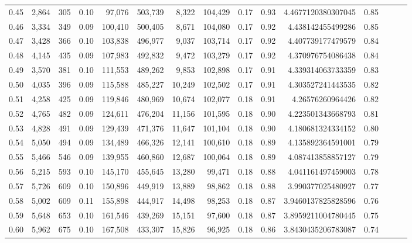 \begin{tabular}{rrrrrrrrrrrrrrr}
0.45 &   2,864 &    305 &  0.10 &   97,076 &  503,739 &    8,322 &  104,429 &  0.17 &  0.93 &    4.4677120380307045 &      0.85 \\
0.46 &   3,334 &    349 &  0.09 &  100,410 &  500,405 &    8,671 &  104,080 &  0.17 &  0.92 &     4.438142455499286 &      0.85 \\
0.47 &   3,428 &    366 &  0.10 &  103,838 &  496,977 &    9,037 &  103,714 &  0.17 &  0.92 &     4.407739177479579 &      0.84 \\
0.48 &   4,145 &    435 &  0.09 &  107,983 &  492,832 &    9,472 &  103,279 &  0.17 &  0.92 &     4.370976754086438 &      0.84 \\
0.49 &   3,570 &    381 &  0.10 &  111,553 &  489,262 &    9,853 &  102,898 &  0.17 &  0.91 &     4.339314063733359 &      0.83 \\
0.50 &   4,035 &    396 &  0.09 &  115,588 &  485,227 &   10,249 &  102,502 &  0.17 &  0.91 &     4.303527241443535 &      0.82 \\
0.51 &   4,258 &    425 &  0.09 &  119,846 &  480,969 &   10,674 &  102,077 &  0.18 &  0.91 &      4.26576260964426 &      0.82 \\
0.52 &   4,765 &    482 &  0.09 &  124,611 &  476,204 &   11,156 &  101,595 &  0.18 &  0.90 &     4.223501343668793 &      0.81 \\
0.53 &   4,828 &    491 &  0.09 &  129,439 &  471,376 &   11,647 &  101,104 &  0.18 &  0.90 &     4.180681324334152 &      0.80 \\
0.54 &   5,050 &    494 &  0.09 &  134,489 &  466,326 &   12,141 &  100,610 &  0.18 &  0.89 &     4.135892364591001 &      0.79 \\
0.55 &   5,466 &    546 &  0.09 &  139,955 &  460,860 &   12,687 &  100,064 &  0.18 &  0.89 &     4.087413858857127 &      0.79 \\
0.56 &   5,215 &    593 &  0.10 &  145,170 &  455,645 &   13,280 &   99,471 &  0.18 &  0.88 &     4.041161497459003 &      0.78 \\
0.57 &   5,726 &    609 &  0.10 &  150,896 &  449,919 &   13,889 &   98,862 &  0.18 &  0.88 &     3.990377025480927 &      0.77 \\
0.58 &   5,002 &    609 &  0.11 &  155,898 &  444,917 &   14,498 &   98,253 &  0.18 &  0.87 &    3.9460137825828596 &      0.76 \\
0.59 &   5,648 &    653 &  0.10 &  161,546 &  439,269 &   15,151 &   97,600 &  0.18 &  0.87 &    3.8959211004780445 &      0.75 \\
0.60 &   5,962 &    675 &  0.10 &  167,508 &  433,307 &   15,826 &   96,925 &  0.18 &  0.86 &    3.8430435206783087 &      0.74 \\

\end{tabular}
